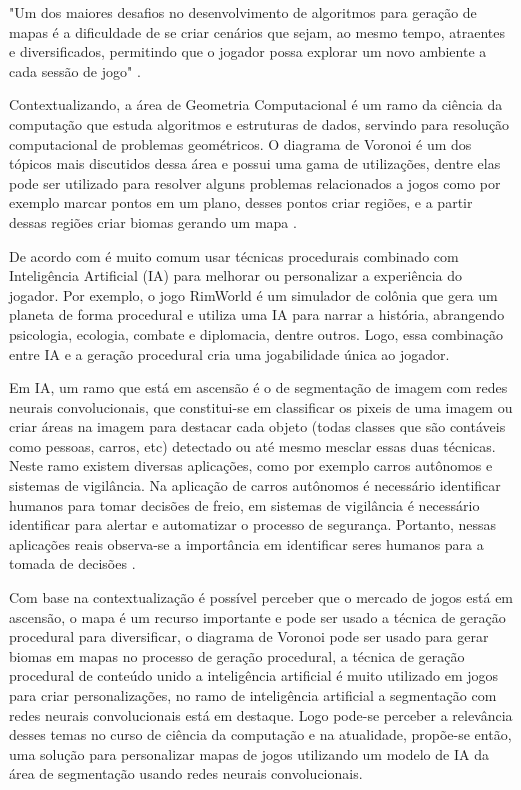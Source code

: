 "Um dos maiores desafios  no desenvolvimento de algoritmos para geração de mapas é  a  dificuldade  de  se  criar  cenários  que  sejam,  ao mesmo  tempo,  atraentes  e diversificados,  permitindo que o jogador possa explorar um novo ambiente a cada sessão de jogo" \space\cite{geracao_procedural_jogos_2d}.

Contextualizando, a área de Geometria Computacional é um ramo da ciência da computação que estuda algoritmos e estruturas de dados, servindo para resolução computacional de problemas geométricos. O diagrama de Voronoi é um dos tópicos mais discutidos dessa
área e possui uma gama de utilizações, dentre elas pode ser utilizado para resolver alguns problemas relacionados a jogos como por exemplo marcar pontos em um plano, desses pontos criar regiões, e a partir dessas regiões criar biomas gerando um mapa \space\cite{rodrigues_diagrama_2019}.


De acordo com  é muito comum usar técnicas procedurais combinado com Inteligência Artificial (IA) para melhorar ou personalizar a experiência do jogador. Por exemplo, o jogo RimWorld é um simulador de colônia que gera um planeta de forma procedural e utiliza uma IA para narrar a história, abrangendo psicologia, ecologia, combate e diplomacia, dentre outros. Logo, essa combinação entre IA e a geração procedural cria uma jogabilidade única ao jogador.


Em IA, um ramo que está em ascensão é o de segmentação de imagem com redes neurais convolucionais, que constitui-se em classificar os pixeis de uma imagem ou criar áreas na imagem para destacar cada objeto (todas classes que são contáveis como pessoas, carros, etc) detectado ou até mesmo mesclar essas duas técnicas. Neste ramo existem diversas aplicações, como por exemplo carros autônomos e sistemas de vigilância.
Na aplicação de carros autônomos é necessário identificar humanos para tomar decisões de freio, em sistemas de vigilância é necessário identificar para alertar e automatizar o processo de segurança. Portanto, nessas aplicações reais observa-se a importância em identificar seres humanos para a tomada de decisões \space\cite{dp_semantic_segmantation}.


Com base na contextualização é possível perceber que o mercado de jogos está em ascensão, o mapa é um recurso importante e pode ser usado a técnica de geração procedural para diversificar, o diagrama de Voronoi pode ser usado para gerar biomas em mapas no processo de geração procedural, a técnica de geração procedural de conteúdo unido a inteligência artificial é muito utilizado em jogos para criar personalizações, no ramo de inteligência artificial a segmentação com redes neurais convolucionais está em destaque. Logo pode-se perceber a relevância desses temas no curso de ciência da computação e na atualidade, propõe-se então, uma solução para personalizar mapas de jogos utilizando um modelo de IA da área de segmentação usando redes neurais convolucionais.

